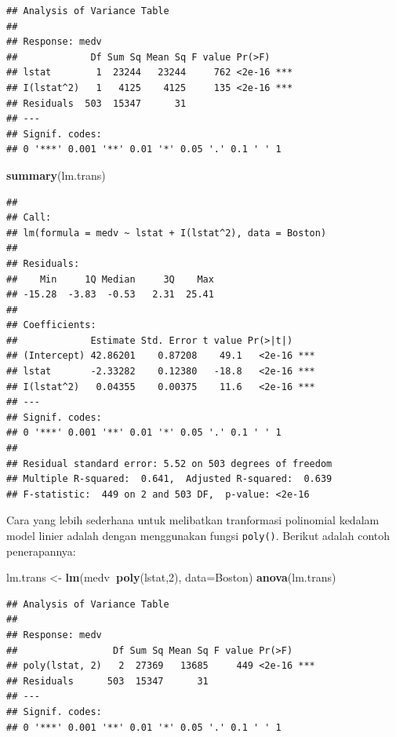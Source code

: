 \documentclass[]{book}
\newenvironment{Shaded}{\begin{snugshade}}{\end{snugshade}}
\newcommand{\DataTypeTok}[1]{\textcolor[rgb]{0.13,0.29,0.53}{#1}}
\newcommand{\DecValTok}[1]{\textcolor[rgb]{0.00,0.00,0.81}{#1}}
\newcommand{\KeywordTok}[1]{\textcolor[rgb]{0.13,0.29,0.53}{\textbf{#1}}}
\newcommand{\NormalTok}[1]{#1}
\newcommand{\OperatorTok}[1]{\textcolor[rgb]{0.81,0.36,0.00}{\textbf{#1}}}
\newcommand{\StringTok}[1]{\textcolor[rgb]{0.31,0.60,0.02}{#1}}
\theoremstyle{definition}
\theoremstyle{definition}
\theoremstyle{definition}
\theoremstyle{remark}
\begin{document}
\begin{verbatim}
## Analysis of Variance Table
## 
## Response: medv
##             Df Sum Sq Mean Sq F value Pr(>F)    
## lstat        1  23244   23244     762 <2e-16 ***
## I(lstat^2)   1   4125    4125     135 <2e-16 ***
## Residuals  503  15347      31                   
## ---
## Signif. codes:  
## 0 '***' 0.001 '**' 0.01 '*' 0.05 '.' 0.1 ' ' 1
\end{verbatim}

\begin{Shaded}
\begin{Highlighting}[]
\KeywordTok{summary}\NormalTok{(lm.trans)}
\end{Highlighting}
\end{Shaded}

\begin{verbatim}
## 
## Call:
## lm(formula = medv ~ lstat + I(lstat^2), data = Boston)
## 
## Residuals:
##    Min     1Q Median     3Q    Max 
## -15.28  -3.83  -0.53   2.31  25.41 
## 
## Coefficients:
##             Estimate Std. Error t value Pr(>|t|)    
## (Intercept) 42.86201    0.87208    49.1   <2e-16 ***
## lstat       -2.33282    0.12380   -18.8   <2e-16 ***
## I(lstat^2)   0.04355    0.00375    11.6   <2e-16 ***
## ---
## Signif. codes:  
## 0 '***' 0.001 '**' 0.01 '*' 0.05 '.' 0.1 ' ' 1
## 
## Residual standard error: 5.52 on 503 degrees of freedom
## Multiple R-squared:  0.641,  Adjusted R-squared:  0.639 
## F-statistic:  449 on 2 and 503 DF,  p-value: <2e-16
\end{verbatim}

Cara yang lebih sederhana untuk melibatkan tranformasi polinomial kedalam model linier adalah dengan menggunakan fungsi \texttt{poly()}. Berikut adalah contoh penerapannya:

\begin{Shaded}
\begin{Highlighting}[]
\NormalTok{lm.trans <-}\StringTok{ }\KeywordTok{lm}\NormalTok{(medv}\OperatorTok{~}\KeywordTok{poly}\NormalTok{(lstat,}\DecValTok{2}\NormalTok{), }\DataTypeTok{data=}\NormalTok{Boston)}
\KeywordTok{anova}\NormalTok{(lm.trans)}
\end{Highlighting}
\end{Shaded}

\begin{verbatim}
## Analysis of Variance Table
## 
## Response: medv
##                 Df Sum Sq Mean Sq F value Pr(>F)    
## poly(lstat, 2)   2  27369   13685     449 <2e-16 ***
## Residuals      503  15347      31                   
## ---
## Signif. codes:  
## 0 '***' 0.001 '**' 0.01 '*' 0.05 '.' 0.1 ' ' 1
\end{verbatim}
\end{document}
